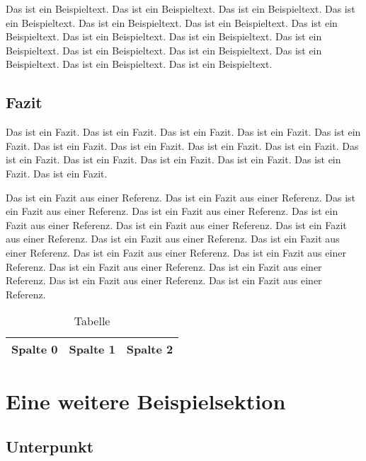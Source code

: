 Das ist ein Beispieltext. Das ist ein Beispieltext. Das ist ein Beispieltext. Das ist ein Beispieltext. Das ist ein Beispieltext. Das ist ein Beispieltext. Das ist ein Beispieltext. Das ist ein Beispieltext. Das ist ein Beispieltext. Das ist ein Beispieltext. Das ist ein Beispieltext. Das ist ein Beispieltext. Das ist ein Beispieltext. Das ist ein Beispieltext. Das ist ein Beispieltext.

\subsection{Fazit}
\label{subsec:01-00-01-conclusion}

Das ist ein Fazit. Das ist ein Fazit. Das ist ein Fazit. Das ist ein Fazit. Das ist ein Fazit. Das ist ein Fazit. Das ist ein Fazit. Das ist ein Fazit. Das ist ein Fazit. Das ist ein Fazit. Das ist ein Fazit. Das ist ein Fazit. Das ist ein Fazit. Das ist ein Fazit. Das ist ein Fazit.

Das ist ein Fazit aus einer Referenz. Das ist ein Fazit aus einer Referenz. Das ist ein Fazit aus einer Referenz. Das ist ein Fazit aus einer Referenz. Das ist ein Fazit aus einer Referenz. Das ist ein Fazit aus einer Referenz. Das ist ein Fazit aus einer Referenz. Das ist ein Fazit aus einer Referenz. Das ist ein Fazit aus einer Referenz. Das ist ein Fazit aus einer Referenz. Das ist ein Fazit aus einer Referenz. Das ist ein Fazit aus einer Referenz. Das ist ein Fazit aus einer Referenz. Das ist ein Fazit aus einer Referenz. Das ist ein Fazit aus einer Referenz. \cite{000:Reference}

\begin{table}
	\centering
	\begin{tabulary}{\textwidth}{|L|L|L|}
		\hline
		Spalte 0 & Spalte 1 & Spalte 2 \\\hline
	\end{tabulary}
	\caption{Tabelle}
\end{table}

\section{Eine weitere Beispielsektion}
\label{sec:01-01-example}

\subsection{Unterpunkt}
\label{subsec:01-01-00-subsection}

